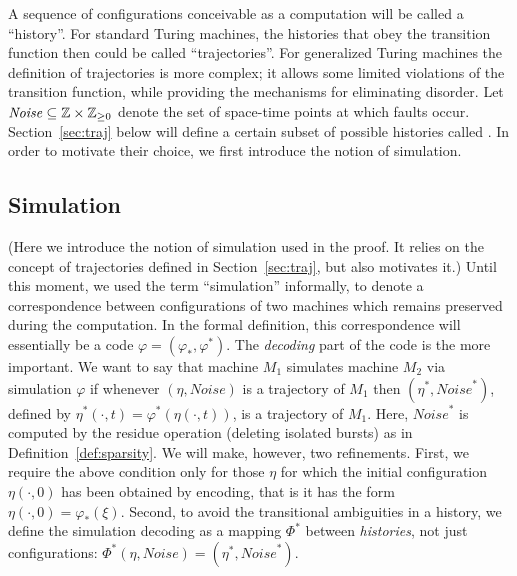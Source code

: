 \documentclass[11pt]{memoir}
\theoremstyle{definition} %
\renewcommand{\ge}{\geq}
\newcommand{\Noise}{\mathit{Noise}}
\begin{document}
A sequence of configurations conceivable as a computation will be called a ``history''.
For standard Turing machines, 
the histories that obey the transition function then could be called ``trajectories''.
For generalized Turing machines the definition of trajectories is more complex; it
allows some limited violations of the transition function, while providing the mechanisms
for eliminating disorder.
Let \(    \Noise\subseteq \bbZ\times\bbZ_{\ge 0} \)
denote the set of space-time points at which faults occur.
Section~\ref{sec:traj} below will define a certain subset of possible histories
called .
In order to motivate their choice, we first introduce the notion of simulation.

 \subsection{Simulation}\label{sec:sim}

 (Here we introduce the notion of simulation used in the proof.
 It relies on the concept of trajectories defined in Section~\ref{sec:traj},
 but also motivates it.)
Until this moment, we used the term ``simulation'' informally, to denote
a correspondence between configurations of
two machines which remains preserved during the computation.
In the formal definition, this correspondence will essentially be a code
\( \varphi=(\varphi_{*},\varphi^{*}) \).
The \emph{decoding} part of the code is the more important.
We want to say that machine \( M_{1} \) simulates machine \( M_{2} \) via
simulation \( \varphi \) if whenever \( (\eta, \Noise) \) is a trajectory of \( M_{1} \) 
then \( (\eta^{*},\Noise^{*}) \),
defined by \( \eta^{*}(\cdot,t)=\varphi^{*}(\eta(\cdot,t)) \), is a
trajectory of \( M_{1} \).
Here, \( \Noise^{*} \) is computed by the residue operation (deleting isolated bursts)
as in Definition~\ref{def:sparsity}.
We will make, however, two refinements.
First, we require the above condition only for
those \( \eta \) for which the initial configuration
 \( \eta(\cdot,0) \) has been obtained by encoding, that is it has the form 
\( \eta(\cdot,0)=\varphi_{*}(\xi) \).
Second, to avoid the transitional ambiguities in a history,
we define the simulation decoding as a mapping \( \Phi^{*} \)
between \emph{histories}, not just configurations:
\( \Phi^{*}(\eta,\Noise)=(\eta^{*},\Noise^{*}) \).
\end{document}
